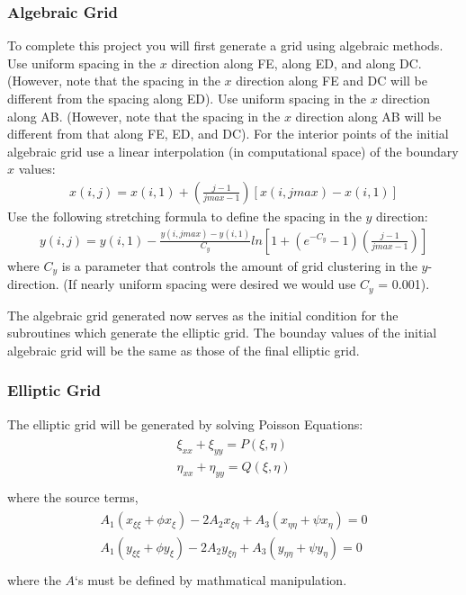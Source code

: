\documentclass[letterpaper,10pt,english]{sphinxmanual}
\begin{document}
\subsubsection{Algebraic Grid}
\label{\detokenize{background:algebraic-grid}}
To complete this project you will first generate a grid using algebraic methods. Use uniform spacing in the \(x\) direction along FE, along ED, and along DC. (However, note that the spacing in the \(x\) direction along FE and DC will be different from the spacing along ED). Use uniform spacing in the \(x\) direction along AB. (However, note that the spacing in the \(x\) direction along AB will be different from that along FE, ED, and DC). For the interior points of the initial algebraic grid use a linear interpolation (in computational space) of the boundary \(x\) values:
\begin{equation*}
\begin{split}x(i,j) = x(i,1) + \left ( \frac{j-1}{jmax-1} \right ) [x(i,jmax) - x(i,1)]\end{split}
\end{equation*}
Use the following stretching formula to define the spacing in the \(y\) direction:
\begin{equation*}
\begin{split}y(i,j) = y(i,1) - \frac{y(i,jmax)-y(i,1)}{C_{y}} ln \left [ 1 + (e^{-C_{y}} - 1) \left ( \frac{j-1}{jmax-1} \right ) \right ]\end{split}
\end{equation*}
where \(C_{y}\) is a parameter that controls the amount of grid clustering in the \(y\)-direction. (If nearly uniform spacing were desired we would use \(C_{y}\) = 0.001).

The algebraic grid generated now serves as the initial condition for the subroutines which generate the elliptic grid. The bounday values of the initial algebraic grid will be the same as those of the final elliptic grid.


\subsubsection{Elliptic Grid}
\label{\detokenize{background:elliptic-grid}}
The elliptic grid will be generated by solving Poisson Equations:
\begin{align*}\!\begin{aligned}
\xi_{xx} + \xi_{yy} = P(\xi,\eta)\\
\eta_{xx} + \eta_{yy} = Q(\xi,\eta)\\
\end{aligned}\end{align*}
where the source terms,
\begin{align*}\!\begin{aligned}
A_{1} (x_{\xi\xi} + \phi x_{\xi}) - 2A_{2} x_{\xi\eta} + A_{3}(x_{\eta\eta} + \psi x_{\eta}) = 0\\
A_{1} (y_{\xi\xi} + \phi y_{\xi}) - 2A_{2} y_{\xi\eta} + A_{3}(y_{\eta\eta} + \psi y_{\eta}) = 0\\
\end{aligned}\end{align*}
where the \(A\)‘s must be defined by mathmatical manipulation.
\end{document}
